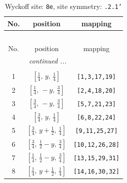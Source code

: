 \documentclass[fleqn,8pt]{jsarticle}
\begin{document}
\begin{longtable}{ccc}
\caption{Wyckoff site: {\tt 8e}, site symmetry: {\tt .2.1'}}
 \\
 \hline \hline
No. & position & mapping \\ \hline \endfirsthead

\multicolumn{2}{l}{\tablename\ \thetable{}} \\
 \hline \hline
No. & position & mapping \\ \hline \endhead

 \hline \hline
\multicolumn{2}{r}{\footnotesize\it continued ...} \\ \endfoot

 \hline \hline
\multicolumn{2}{r}{} \\ \endlastfoot

1 & $\left[ \frac{1}{4},\, y,\, \frac{1}{4} \right]$ & {\tt [1,3,17,19]} \\ \hline
2 & $\left[ \frac{1}{4},\, - y,\, \frac{3}{4} \right]$ & {\tt [2,4,18,20]} \\ \hline
3 & $\left[ \frac{3}{4},\, - y,\, \frac{3}{4} \right]$ & {\tt [5,7,21,23]} \\ \hline
4 & $\left[ \frac{3}{4},\, y,\, \frac{1}{4} \right]$ & {\tt [6,8,22,24]} \\ \hline
5 & $\left[ \frac{3}{4},\, y + \frac{1}{2},\, \frac{1}{4} \right]$ & {\tt [9,11,25,27]} \\ \hline
6 & $\left[ \frac{3}{4},\, \frac{1}{2} - y,\, \frac{3}{4} \right]$ & {\tt [10,12,26,28]} \\ \hline
7 & $\left[ \frac{1}{4},\, \frac{1}{2} - y,\, \frac{3}{4} \right]$ & {\tt [13,15,29,31]} \\ \hline
8 & $\left[ \frac{1}{4},\, y + \frac{1}{2},\, \frac{1}{4} \right]$ & {\tt [14,16,30,32]} \\
\end{longtable}
\renewcommand{\arraystretch}{1.2}
\end{document}
